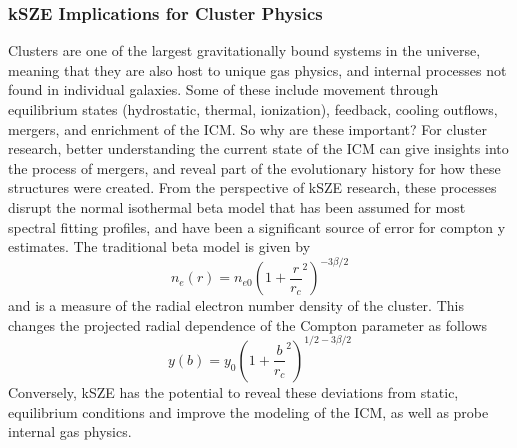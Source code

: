 \documentclass[manuscript]{aastex}
\begin{document}




	
\subsubsection{\textbf{kSZE Implications for Cluster Physics}}

Clusters are one of the largest gravitationally bound systems in the universe, meaning that they are also host to unique gas physics, and internal processes not found in individual galaxies. Some of these include movement through equilibrium states (hydrostatic, thermal, ionization), feedback, cooling outflows, mergers, and enrichment of the ICM. So why are these important? For cluster research, better understanding the current state of the ICM can give insights into the process of mergers, and reveal part of the evolutionary history for how these structures were created. From the perspective of kSZE research, these processes disrupt the normal isothermal beta model that has been assumed for most spectral fitting profiles, and have been a significant source of error for compton y estimates. The traditional beta model is given by 
\begin{equation}
    n_{e}(r) = n_{e0}(1 + \frac{r}{r_{c}}^{2})^{-3\beta/2}
\end{equation}
and is a measure of the radial electron number density of the cluster. This changes the projected radial dependence of the Compton parameter as follows
\begin{equation}
    y(b) = y_{0}(1 + \frac{b}{r_{c}}^{2})^{1/2 - 3\beta/2}
\end{equation}
Conversely, kSZE has the potential to reveal these deviations from static, equilibrium conditions and improve the modeling of the ICM, as well as probe internal gas physics. 
\end{document}
